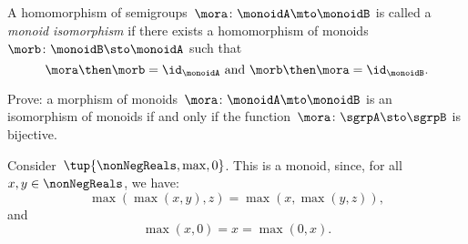 \begin{definition}
  \label{def:monoid-iso}
  A homomorphism of semigroups~$\mora\colon \monoidA \mto \monoidB$ is called a \emph{monoid isomorphism} if there exists a homomorphism of monoids~$\morb\colon \monoidB \sto \monoidA$ such that
  \begin{equation}
    \label{sgrp-iso-cond}
    \mora \then \morb = \id_\monoidA \text{ and } \morb \then \mora = \id_\monoidB.
  \end{equation}
\end{definition}


\begin{exercise}
  Prove: a morphism of monoids~$\mora\colon \monoidA \mto \monoidB$ is an isomorphism of monoids if and only if the function~$\mora\colon \sgrpA \sto \sgrpB$ is bijective.
\end{exercise}




\begin{example}
  Consider~$\tup{\nonNegReals,\max,0}$. This is a monoid, since, for all~$x,y\in \nonNegReals$, we have:
  \begin{equation*}
    \max(\max(x,y),z)=\max(x,\max(y,z)),
  \end{equation*}
  and
  \begin{equation*}
    \max(x,0)=x=\max(0,x).
  \end{equation*}
\end{example}





